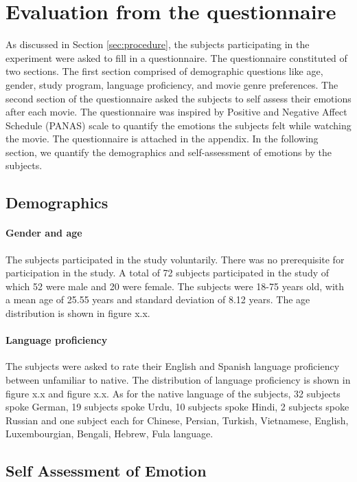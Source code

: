 \section{Evaluation from the questionnaire}
As discussed in Section \ref{sec:procedure}, the subjects participating in the experiment were asked to fill in a questionnaire. The questionnaire constituted of two sections. The first section comprised of demographic questions like age, gender, study program, language proficiency, and movie genre preferences. The second section of the questionnaire asked the subjects to self assess their emotions after each movie. The questionnaire was inspired by Positive and Negative Affect Schedule (PANAS) scale\cite{panas_crocker:1997} to quantify the emotions the subjects felt while watching the movie. The questionnaire is attached in the appendix. In the following section, we quantify the demographics and self-assessment of emotions by the subjects.
\subsection{Demographics}
\paragraph{Gender and age} The subjects participated in the study voluntarily. There was no prerequisite for participation in the study. A total of 72 subjects participated in the study of which 52 were male and 20 were female. The subjects were 18-75 years old, with a mean age of 25.55 years and standard deviation of 8.12 years. The age distribution is shown in figure x.x.

\paragraph{Language proficiency} The subjects were asked to rate their English and Spanish language proficiency between unfamiliar to native. The distribution of language proficiency is shown in figure x.x and figure x.x. As for the native language of the subjects, 32 subjects spoke German, 19 subjects spoke Urdu, 10 subjects spoke Hindi, 2 subjects spoke Russian and one subject each for Chinese, Persian, Turkish, Vietnamese, English, Luxembourgian, Bengali, Hebrew, Fula language.

\subsection{Self Assessment of Emotion}

